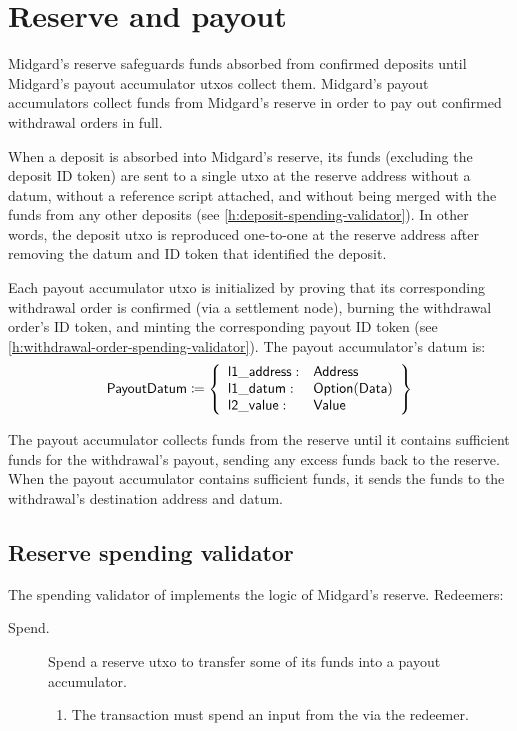 \documentclass[../midgard.tex]{subfiles}
\begin{document}
\section{Reserve and payout}
\label{h:reserve-and-payout}

Midgard's reserve safeguards funds absorbed from confirmed deposits until Midgard's payout accumulator utxos collect them.
Midgard's payout accumulators collect funds from Midgard's reserve in order to pay out confirmed withdrawal orders in full.

When a deposit is absorbed into Midgard's reserve, its funds (excluding the deposit ID token) are sent to a single utxo at the reserve address without a datum, without a reference script attached, and without being merged with the funds from any other deposits (see \cref{h:deposit-spending-validator}).
In other words, the deposit utxo is reproduced one-to-one at the reserve address after removing the datum and ID token that identified the deposit.

Each payout accumulator utxo is initialized by proving that its corresponding withdrawal order is confirmed (via a settlement node), burning the withdrawal order's ID token, and minting the corresponding payout ID token (see \cref{h:withdrawal-order-spending-validator}).
The payout accumulator's datum is:
\begin{equation*}
  \mathsf{PayoutDatum} \coloneq \left\{
  \begin{array}{ll}
    \mathsf{l1\_address}: & \mathsf{Address} \\
    \mathsf{l1\_datum}: & \mathsf{Option}(\mathsf{Data}) \\
    \mathsf{l2\_value}: & \mathsf{Value}
  \end{array}\right\}
\end{equation*}

The payout accumulator collects funds from the reserve until it contains sufficient funds for the withdrawal's payout, sending any excess funds back to the reserve.
When the payout accumulator contains sufficient funds, it sends the funds to the withdrawal's destination address and datum.

\subsection{Reserve spending validator}%
\label{h:reserve-spending-validator}%

The spending validator of  implements the logic of Midgard's reserve.
Redeemers:
\begin{description}
  \item[Spend.] Spend a reserve utxo to transfer some of its funds into a payout accumulator.
    \begin{enumerate}
      \item The transaction must spend an input from the  via the  redeemer.
    \end{enumerate}
\end{description}
\end{document}
